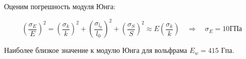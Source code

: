 \documentclass[8pt]{article}
\begin{document}
\begin{enumerate}
    Оценим погрешность модуля Юнга:
    
    $$\left(\frac{\sigma_{E}}{E}\right)^2 
    = \left(\frac{\sigma_{k}}{k}\right)^2
    + \left(\frac{\sigma_{l_0}}{l_0}\right)^2
    + \left(\frac{\sigma_{S}}{S}\right)^2 \approx E \left(\frac{\sigma_{k}}{k}\right)
    \quad \Rightarrow \quad
    \sigma_{E} = 10 \text{ГПа}$$

    Наиболее близкое значение к модулю Юнга для вольфрама $E_w = 415$ Гпа.
    \end{enumerate}
    
\end{document}
